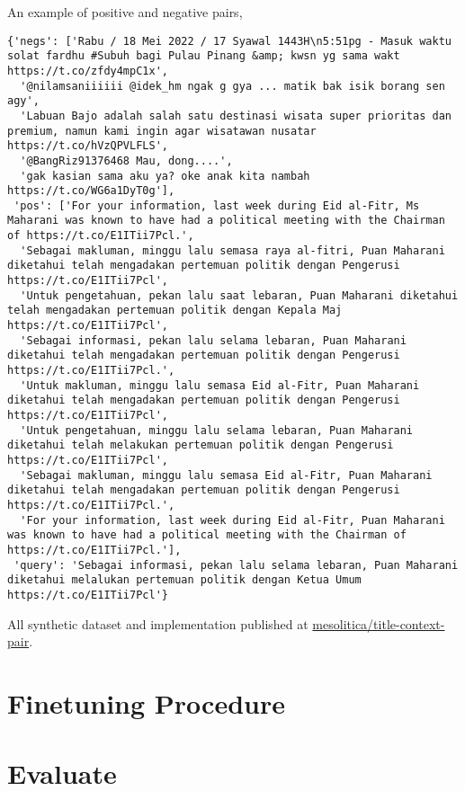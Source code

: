 \documentclass[preprint]{article}
\begin{document}
An example of positive and negative pairs,

\begin{lstlisting}[breaklines=true]
{'negs': ['Rabu / 18 Mei 2022 / 17 Syawal 1443H\n5:51pg - Masuk waktu solat fardhu #Subuh bagi Pulau Pinang &amp; kwsn yg sama wakt https://t.co/zfdy4mpC1x',
  '@nilamsaniiiiii @idek_hm ngak g gya ... matik bak isik borang sen agy',
  'Labuan Bajo adalah salah satu destinasi wisata super prioritas dan premium, namun kami ingin agar wisatawan nusatar https://t.co/hVzQPVLFLS',
  '@BangRiz91376468 Mau, dong....',
  'gak kasian sama aku ya? oke anak kita nambah https://t.co/WG6a1DyT0g'],
 'pos': ['For your information, last week during Eid al-Fitr, Ms Maharani was known to have had a political meeting with the Chairman of https://t.co/E1ITii7Pcl.',
  'Sebagai makluman, minggu lalu semasa raya al-fitri, Puan Maharani diketahui telah mengadakan pertemuan politik dengan Pengerusi https://t.co/E1ITii7Pcl',
  'Untuk pengetahuan, pekan lalu saat lebaran, Puan Maharani diketahui telah mengadakan pertemuan politik dengan Kepala Maj https://t.co/E1ITii7Pcl',
  'Sebagai informasi, pekan lalu selama lebaran, Puan Maharani diketahui telah mengadakan pertemuan politik dengan Pengerusi https://t.co/E1ITii7Pcl.',
  'Untuk makluman, minggu lalu semasa Eid al-Fitr, Puan Maharani diketahui telah mengadakan pertemuan politik dengan Pengerusi https://t.co/E1ITii7Pcl',
  'Untuk pengetahuan, minggu lalu selama lebaran, Puan Maharani diketahui telah melakukan pertemuan politik dengan Pengerusi https://t.co/E1ITii7Pcl',
  'Sebagai makluman, minggu lalu semasa Eid al-Fitr, Puan Maharani diketahui telah mengadakan pertemuan politik dengan Pengerusi https://t.co/E1ITii7Pcl.',
  'For your information, last week during Eid al-Fitr, Puan Maharani was known to have had a political meeting with the Chairman of https://t.co/E1ITii7Pcl.'],
 'query': 'Sebagai informasi, pekan lalu selama lebaran, Puan Maharani diketahui melalukan pertemuan politik dengan Ketua Umum https://t.co/E1ITii7Pcl'}
\end{lstlisting}

All synthetic dataset and implementation published at \href{https://huggingface.co/datasets/mesolitica/title-context-pair}{mesolitica/title-context-pair}.

\section{Finetuning Procedure}

\section{Evaluate}
\end{document}
